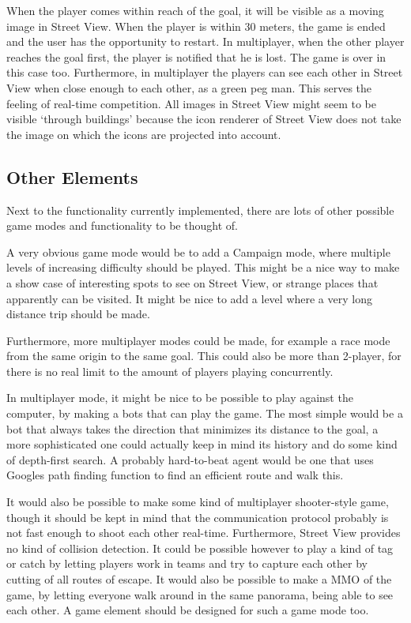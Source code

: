 \documentclass[a4paper,10pt]{article}
\begin{document}
When the player comes within reach of the goal, it will be visible as a moving image in Street View. When the player is within 30 meters, the game is ended and the user has the opportunity to restart. In multiplayer, when the other player reaches the goal first, the player is notified that he is lost. The game is over in this case too. Furthermore, in multiplayer the players can see each other in Street View when close enough to each other, as a green peg man. This serves the feeling of real-time competition. All images in Street View might seem to be visible `through buildings' because the icon renderer of Street View does not take the image on which the icons are projected into account.

\subsection{Other Elements} %
\label{sub:other_elements}

Next to the functionality currently implemented, there are lots of other possible game modes and functionality to be thought of.

A very obvious game mode would be to add a Campaign mode, where multiple levels of increasing difficulty should be played. This might be a nice way to make a show case of interesting spots to see on Street View, or strange places that apparently can be visited. It might be nice to add a level where a very long distance trip should be made.

Furthermore, more multiplayer modes could be made, for example a race mode from the same origin to the same goal. This could also be more than 2-player, for there is no real limit to the amount of players playing concurrently.

In multiplayer mode, it might be nice to be possible to play against the computer, by making a bots that can play the game. The most simple would be a bot that always takes the direction that minimizes its distance to the goal, a more sophisticated one could actually keep in mind its history and do some kind of depth-first search. A probably hard-to-beat agent would be one that uses Googles path finding function to find an efficient route and walk this.

It would also be possible to make some kind of multiplayer shooter-style game, though it should be kept in mind that the communication protocol probably is not fast enough to shoot each other real-time. Furthermore, Street View provides no kind of collision detection. It could be possible however to play a kind of tag or catch by letting players work in teams and try to capture each other by cutting of all routes of escape. It would also be possible to make a MMO of the game, by letting everyone walk around in the same panorama, being able to see each other. A game element should be designed for such a game mode too.
\end{document}
